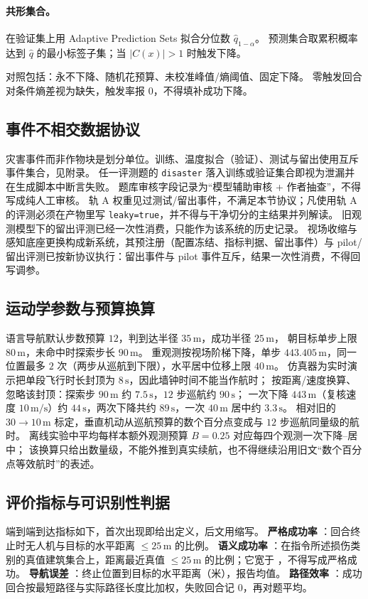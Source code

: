 \paragraph{共形集合。}
在验证集上用 Adaptive Prediction Sets 拟合分位数 $\hat q_{1-\alpha}$。
预测集合取累积概率达到 $\hat q$ 的最小标签子集；当 $|C(x)|>1$ 时触发下降。

对照包括：永不下降、随机花预算、未校准峰值/熵阈值、固定下降。
零触发回合对条件熵差视为缺失，触发率报 0，不得填补成功下降。

\subsection{事件不相交数据协议}
\label{sec:split}
灾害事件而非作物块是划分单位。训练、温度拟合（验证）、测试与留出使用互斥事件集合，见附录。
任一评测题的 \texttt{disaster} 落入训练或验证集合即视为泄漏并在生成脚本中断言失败。
题库审核字段记录为``模型辅助审核 + 作者抽查''，不得写成纯人工审核。
轨 A 权重见过测试/留出事件，不满足本节协议；凡使用轨 A 的评测必须在产物里写 \texttt{leaky=true}，并不得与干净切分的主结果并列解读。
旧观测模型下的留出评测已经一次性消费，只能作为该系统的历史记录。
视场收缩与感知底座更换构成新系统，其预注册（配置冻结、指标判据、留出事件）与 pilot/留出评测已按新协议执行：留出事件与 pilot 事件互斥，结果一次性消费，不得回写调参。

\subsection{运动学参数与预算换算}
\label{sec:kinematics}
语言导航默认步数预算 $12$，判到达半径 $35\,\mathrm{m}$，成功半径 $25\,\mathrm{m}$，
朝目标单步上限 $80\,\mathrm{m}$，未命中时探索步长 $90\,\mathrm{m}$。
重观测按视场阶梯下降，单步 $443.405\,\mathrm{m}$，同一位置最多 $2$ 次（两步从巡航到下限），水平居中位移上限 $40\,\mathrm{m}$。
仿真器为实时演示把单段飞行时长封顶为 $8\,\mathrm{s}$，因此墙钟时间不能当作航时；
按距离/速度换算、忽略该封顶：探索步 $90\,\mathrm{m}$ 约 $7.5\,\mathrm{s}$，$12$ 步巡航约 $90\,\mathrm{s}$；
一次下降 $443\,\mathrm{m}$（复核速度 $10\,\mathrm{m/s}$）约 $44\,\mathrm{s}$，两次下降共约 $89\,\mathrm{s}$，一次 $40\,\mathrm{m}$ 居中约 $3.3\,\mathrm{s}$。
相对旧的 $30\to10\,\mathrm{m}$ 标定，垂直机动从巡航预算的数个百分点变成与 $12$ 步巡航同量级的航时。
离线实验中平均每样本额外观测预算 $B=0.25$ 对应每四个观测一次下降--居中；
该换算只给出数量级，不能外推到真实续航，也不得继续沿用旧文``数个百分点等效航时''的表述。

\subsection{评价指标与可识别性判据}
\label{sec:metrics}
端到端到达指标如下，首次出现即给出定义，后文用缩写。
\textbf{严格成功率} \SR：回合终止时无人机与目标的水平距离 $\le 25\,\mathrm{m}$ 的比例。
\textbf{语义成功率} \semSR：在指令所述损伤类别的真值建筑集合上，距离最近真值 $\le 25\,\mathrm{m}$ 的比例；它宽于 \SR，不得写成严格成功。
\textbf{导航误差} \NE：终止位置到目标的水平距离（米），报告均值。
\textbf{路径效率} \SPL：成功回合按最短路径与实际路径长度比加权，失败回合记 0，再对题平均。

